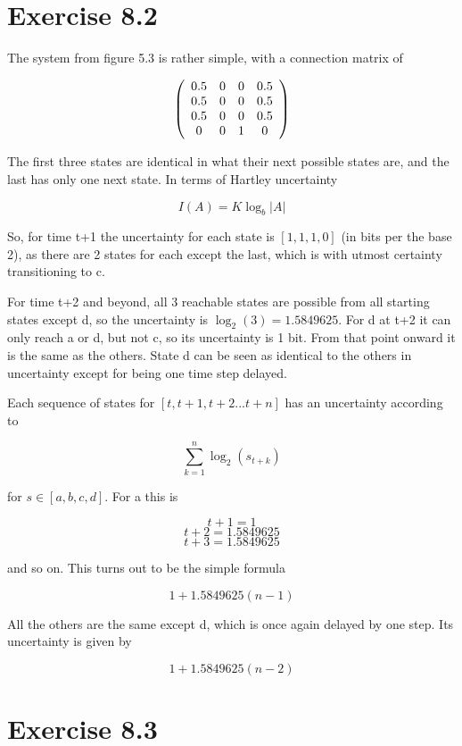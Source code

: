 \documentclass[12pt]{article}
\begin{document}
\maketitle

\section{Exercise 8.2}

The system from figure 5.3 is rather simple, with a connection matrix of

\[ \left( \begin{array}{cccc}
0.5 & 0 & 0 & 0.5 \cr
0.5 & 0 & 0 & 0.5 \cr
0.5 & 0 & 0 & 0.5 \cr
0 & 0 & 1 & 0 \end{array} \right)\]

The first three states are identical in what their next possible states are, and the last has only one next state.  In terms of Hartley uncertainty

$$ I(A)=K\log_b|A| $$

So, for time t+1 the uncertainty for each state is $[1,1,1,0]$ (in bits per the base 2), as there are 2 states for each except the last, which is with utmost certainty transitioning to c.

For time t+2 and beyond, all 3 reachable states are possible from all starting states except d, so the uncertainty is $\log_2(3)=1.5849625$.  For d at t+2 it can only reach a or d, but not c, so its uncertainty is 1 bit.  From that point onward it is the same as the others.  State d can be seen as identical to the others in uncertainty except for being one time step delayed.

Each sequence of states for $[t,t+1,t+2...t+n]$ has an uncertainty according to 

$$ \sum_{k=1}^n{\log_2(s_{t+k})} $$

for $s \in [a,b,c,d]$.  For a this is 

$$ t+1=1 $$
$$ t+2=1.5849625 $$
$$ t+3=1.5849625 $$ 

and so on.  This turns out to be the simple formula 

$$ 1+1.5849625(n-1) $$ 

All the others are the same except d, which is once again delayed by one step.  Its uncertainty is given by 

$$ 1+1.5849625(n-2) $$ 

\section{Exercise 8.3}
\end{document}
